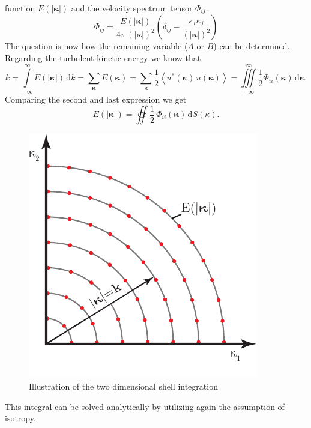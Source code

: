 \documentclass[preprint,12pt,ntfdMod]{elsarticle}
\begin{document}
\begin{par}
function $E(|\boldsymbol\kappa|)$ and the velocity spectrum tensor $\Phi_{ij}$.
  \begin{equation}
  	\Phi_{ij}=\frac{E(|\boldsymbol\kappa|)}{4\pi\,(|\boldsymbol\kappa|)^2}\left(\delta_{ij}
  	-\frac{\kappa_i\kappa_j}{(|\boldsymbol\kappa|)^2}\right)
  \end{equation}
The question is now how the remaining variable ($A$ or $B$) can be determined. Regarding the turbulent kinetic
energy we know that
  \begin{equation}
      \label{eq:exp_for_k}
      k=\int\limits_{-\infty}^{\infty}E(|\boldsymbol\kappa|)\,\mathrm{d}k
      =\sum\limits_{\boldsymbol\kappa}E(\boldsymbol\kappa)
      =\sum\limits_{\boldsymbol\kappa}\frac{1}{2}\left<u^{*}(\boldsymbol\kappa)\,u(\boldsymbol\kappa)\right>
      =\iiint\limits_{-\infty}^{\infty}\frac{1}{2}\Phi_{ii}(\boldsymbol\kappa)\,\mathrm{d}\boldsymbol\kappa.
  \end{equation}
Comparing the second and last expression we get
  \begin{equation}
      E(|\boldsymbol\kappa|)=\oiint\frac{1}{2}\,\Phi_{ii}(\boldsymbol\kappa)\,\mathrm{d}S(\kappa).
  \end{equation}
  \begin{figure}[t!]
      \centering
      \includegraphics[scale=1]{shell_integration}
      \caption{Illustration of the two dimensional shell integration}
      \label{fig:shell_int}
  \end{figure}
This integral can be solved analytically by utilizing again the assumption of isotropy.

\end{par}
\end{document}
